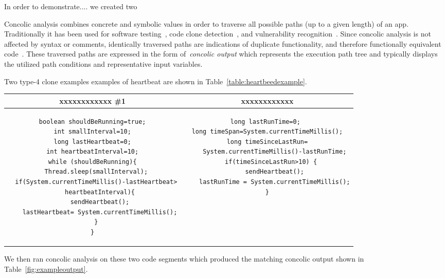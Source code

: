 In order to demonstrate.... we created two



Concolic analysis combines concrete and symbolic values in order to traverse all possible paths (up to a given length) of an app. Traditionally it has been used for software testing~\cite{Sen:2005:CCU:1081706.1081750}, code clone detection~\cite{krutz2013cccd}, and vulnerability recognition~\cite{Chen:2014:CIB:2554850.2554875}. Since concolic analysis is not affected by syntax or comments, identically traversed paths are indications of duplicate functionality, and therefore functionally equivalent code~\cite{krutz2013cccd,krutz2013code}. These traversed paths are expressed in the form of~\emph{concolic output} which represents the execution path tree and typically displays the utilized path conditions and representative input variables.


Two type-4 clone examples examples of heartbeat are shown in Table~\ref{table:heartbeedexample}.

\noindent
\begin{table*}
\centering
\begin{tabular}{c | c}
\bfseries xxxxxxxxxxxx \#1  & \bfseries xxxxxxxxxxxx \\ \hline \hline
\begin{lstlisting}
boolean shouldBeRunning=true;
int smallInterval=10;
long lastHeartbeat=0;
int heartbeatInterval=10;
while (shouldBeRunning){
  Thread.sleep(smallInterval);
  if(System.currentTimeMillis()-lastHeartbeat>
    heartbeatInterval){
    sendHeartbeat();
    lastHeartbeat= System.currentTimeMillis();
  }
}
\end{lstlisting}
&
\begin{lstlisting}
long lastRunTime=0;	
long timeSpan=System.currentTimeMillis();
long timeSinceLastRun=
    System.currentTimeMillis()-lastRunTime;
  if(timeSinceLastRun>10) {
    sendHeartbeat();
	lastRunTime = System.currentTimeMillis();
}
\end{lstlisting}

\end{tabular}
\caption{An Example of Type-2 clones from Roy~\label{table:heartbeedexample}}
\end{table*}


We then ran concolic analysis on these two code segments which produced the matching concolic output shown in Table~\ref{fig:exampleoutput}.


